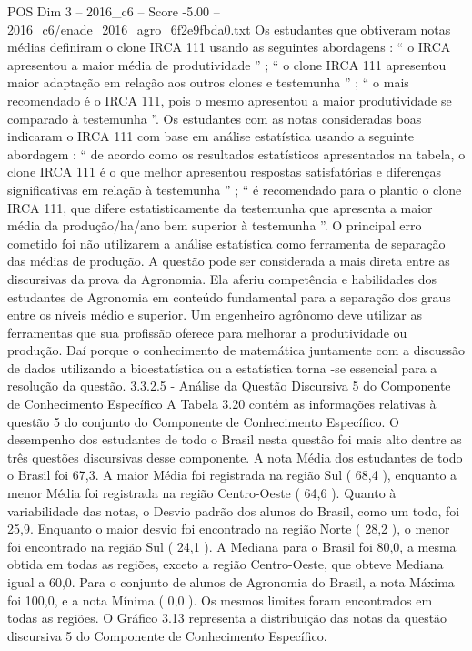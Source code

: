 \begin{textsample}{POS Dim 3 – 2016\_c6 – Score -5.00 – 2016\_c6/enade\_2016\_agro\_6f2e9fbda0.txt}
Os estudantes que obtiveram notas médias definiram o clone IRCA 111 usando as seguintes abordagens : “ o IRCA apresentou a maior média de produtividade ” ; “ o clone IRCA 111 apresentou maior adaptação em relação aos outros clones e testemunha ” ; “ o mais recomendado é o IRCA 111, pois o mesmo apresentou a maior produtividade se comparado à testemunha ”.
Os estudantes com as notas consideradas boas indicaram o IRCA 111 com base em análise estatística usando a seguinte abordagem : “ de acordo como os resultados estatísticos apresentados na tabela, o clone IRCA 111 é o que melhor apresentou respostas satisfatórias e diferenças significativas em relação à testemunha ” ; “ é recomendado para o plantio o clone IRCA 111, que difere estatisticamente da testemunha que apresenta a maior média da produção/ha/ano bem superior à testemunha ”.
O principal erro cometido foi não utilizarem a análise estatística como ferramenta de separação das médias de produção.
A questão pode ser considerada a mais direta entre as discursivas da prova da Agronomia.
Ela aferiu competência e habilidades dos estudantes de Agronomia em conteúdo fundamental para a separação dos graus entre os níveis médio e superior.
Um engenheiro agrônomo deve utilizar as ferramentas que sua profissão oferece para melhorar a produtividade ou produção.
Daí porque o conhecimento de matemática juntamente com a discussão de dados utilizando a bioestatística ou a estatística torna -se essencial para a resolução da questão. 3.3.2.5 - Análise da Questão Discursiva 5 do Componente de Conhecimento Específico A Tabela 3.20 contém as informações relativas à questão 5 do conjunto do Componente de Conhecimento Específico.
O desempenho dos estudantes de todo o Brasil nesta questão foi mais alto dentre as três questões discursivas desse componente.
A nota Média dos estudantes de todo o Brasil foi 67,3.
A maior Média foi registrada na região Sul ( 68,4 ), enquanto a menor Média foi registrada na região Centro-Oeste ( 64,6 ).
Quanto à variabilidade das notas, o Desvio padrão dos alunos do Brasil, como um todo, foi 25,9.
Enquanto o maior desvio foi encontrado na região Norte ( 28,2 ), o menor foi encontrado na região Sul ( 24,1 ).
A Mediana para o Brasil foi 80,0, a mesma obtida em todas as regiões, exceto a região Centro-Oeste, que obteve Mediana igual a 60,0.
Para o conjunto de alunos de Agronomia do Brasil, a nota Máxima foi 100,0, e a nota Mínima ( 0,0 ).
Os mesmos limites foram encontrados em todas as regiões.
O Gráfico 3.13 representa a distribuição das notas da questão discursiva 5 do Componente de Conhecimento Específico.

\end{textsample}
